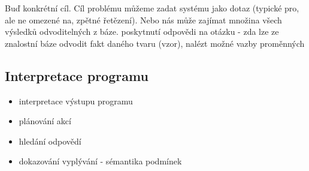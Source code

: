 Buď konkrétní cíl.
Cíl problému můžeme zadat systému jako dotaz (typické pro, ale ne omezené na,
zpětné řetězení).
Nebo nás může zajímat množina všech výsledků odvoditelných z báze.
poskytnutí odpovědi na otázku - zda lze ze znalostní báze odvodit fakt daného
tvaru (vzor), nalézt možné vazby proměnných

\subsection{Interpretace programu}
\begin{framed}
  \begin{itemize}
    \item interpretace výstupu programu
    \item plánování akcí
    \item hledání odpovědí
    \item dokazování vyplývání - sémantika podmínek
  \end{itemize}
\end{framed}

